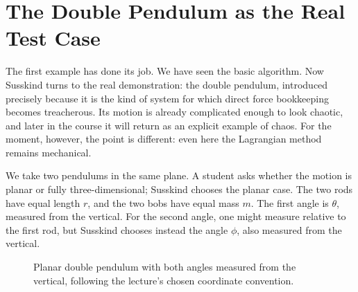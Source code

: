 \section{The Double Pendulum as the Real Test Case}

The first example has done its job. We have seen the basic algorithm. Now Susskind turns to the real demonstration: the double pendulum, introduced precisely because it is the kind of system for which direct force bookkeeping becomes treacherous. Its motion is already complicated enough to look chaotic, and later in the course it will return as an explicit example of chaos. For the moment, however, the point is different: even here the Lagrangian method remains mechanical.

We take two pendulums in the same plane. A student asks whether the motion is planar or fully three-dimensional; Susskind chooses the planar case. The two rods have equal length \(r\), and the two bobs have equal mass \(m\). The first angle is \(\theta\), measured from the vertical. For the second angle, one might measure relative to the first rod, but Susskind chooses instead the angle \(\phi\), also measured from the vertical.

\begin{figure}[h]
\centering
{}
\caption{Planar double pendulum with both angles measured from the vertical, following the lecture's chosen coordinate convention.}
\end{figure}

